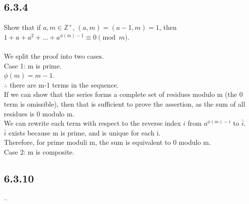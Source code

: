 \documentclass{article}
\begin{document}
\subsection{6.3.4}
Show that if $a, m \in \mathbb{Z}^+$, $(a,m)=(a-1,m)=1$,
then $1+a+a^2+...+a^{\phi(m)-1}\equiv0\pmod{m}$.
\\
\\We split the proof into two cases.
\\Case 1: m is prime.
\\$\phi(m) = m-1$.
\\$\therefore$ there are m-1 terms in the sequence.
\\If we can show that the series forms a complete set of residues modulo m
(the 0 term is omissible),
then that is sufficient to prove the assertion,
as the sum of all residues is 0 modulo m.
\\We can rewrite each term with respect to the reverse index $i$
from $a^{\phi(m)-i}$ to $\bar{i}$.
\\$\bar{i}$ exists because m is prime, and is unique for each i.
\\Therefore, for prime moduli m, the sum is equivalent to 0 modulo m.
\\Case 2: m is composite.

\subsection{6.3.10}
--
\\
\end{document}
